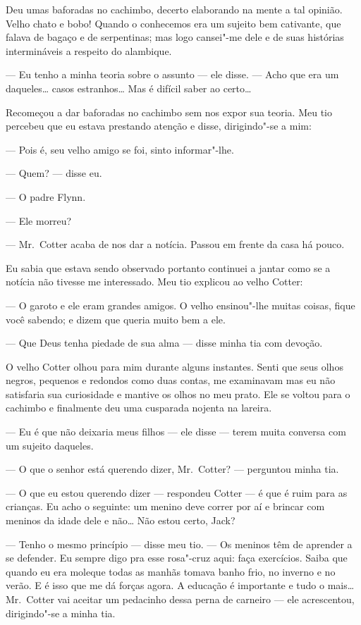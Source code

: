 Deu umas baforadas no cachimbo, decerto elaborando na mente a tal opinião.
Velho chato e bobo! Quando o conhecemos era um sujeito bem cativante, que
falava de bagaço e de serpentinas; mas logo cansei"-me dele e de suas histórias
intermináveis a respeito do alambique.

--- Eu tenho a minha teoria sobre o assunto --- ele disse.  --- Acho que era um
daqueles\ldots{} casos estranhos\ldots{} Mas é difícil saber ao certo\ldots{}

Recomeçou a dar baforadas no cachimbo sem nos expor sua teoria.  Meu tio
percebeu que eu estava prestando atenção e disse, dirigindo"-se a mim:

--- Pois é, seu velho amigo se foi, sinto informar"-lhe.

--- Quem? --- disse eu.

--- O padre Flynn.

--- Ele morreu?

--- Mr.~Cotter acaba de nos dar a notícia.  Passou em frente da casa há pouco.

Eu sabia que estava sendo observado portanto continuei a jantar como se a
notícia não tivesse me interessado.  Meu tio explicou ao velho Cotter:

--- O garoto e ele eram grandes amigos.  O velho ensinou"-lhe muitas coisas,
fique você sabendo; e dizem que queria muito bem a ele.

--- Que Deus tenha piedade de sua alma --- disse minha tia com devoção.

O velho Cotter olhou para mim durante alguns instantes.  Senti que seus olhos
negros, pequenos e redondos como duas contas, me examinavam mas eu não
satisfaria sua curiosidade e mantive os olhos no meu prato.  Ele se voltou para
o cachimbo e finalmente deu uma cusparada nojenta na lareira.

--- Eu é que não deixaria meus filhos --- ele disse --- terem muita conversa
com um sujeito daqueles.

--- O que o senhor está querendo dizer, Mr.~Cotter? --- perguntou minha tia.

--- O que eu estou querendo dizer --- respondeu Cotter --- é que é ruim
para as crianças.  Eu acho o seguinte: um menino deve correr por aí e brincar
com meninos da idade dele e não\ldots{} Não estou certo, Jack?

--- Tenho o mesmo princípio --- disse meu tio.  --- Os meninos têm de aprender
a se defender.  Eu sempre digo pra esse rosa"-cruz aqui: faça exercícios.  Saiba
que quando eu era moleque todas as manhãs tomava banho frio, no inverno e no
verão.  E é isso que me dá forças agora.  A educação é importante e tudo o
mais\ldots{} Mr.~Cotter vai aceitar um pedacinho dessa perna de carneiro ---
ele acrescentou, dirigindo"-se a minha tia.

